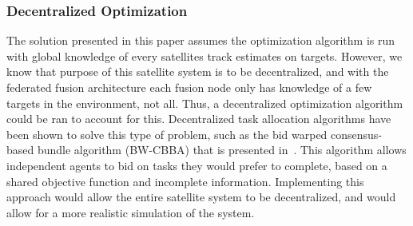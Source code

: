 \subsubsection{Decentralized Optimization}
The solution presented in this paper assumes the optimization algorithm is run with global knowledge of every satellites track estimates on targets.
However, we know that purpose of this satellite system is to be decentralized, and with the federated fusion architecture each fusion node only has knowledge of a few targets in the environment, not all.
Thus, a decentralized optimization algorithm could be ran to account for this.
Decentralized task allocation algorithms have been shown to solve this type of problem, such as the bid warped consensus-based bundle algorithm (BW-CBBA) that is presented in~\cite{b3}.
This algorithm allows independent agents to bid on tasks they would prefer to complete, based on a shared objective function and incomplete information. 
Implementing this approach would allow the entire satellite system to be decentralized, and would allow for a more realistic simulation of the system.


